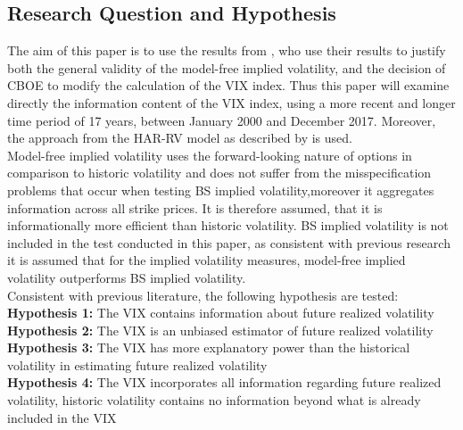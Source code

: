 \subsection{Research Question and Hypothesis}\label{sec:32Hypothesis}
The aim of this paper is to use the results from \textcite{jiang2003}, who use their results to justify both the general validity of the model-free implied volatility, and the decision of \gls{CBOE} to modify the calculation of the VIX index. Thus this paper will examine directly the information content of the VIX index, using a more recent and longer time period of 17 years, between January 2000 and December 2017. 
Moreover, the approach from the HAR-RV model as described by \textcite{Corsi2009} is used.\\
Model-free implied volatility uses the forward-looking nature of options in comparison to historic volatility and does not suffer from the misspecification problems that occur when testing \gls{BS} implied volatility,moreover it aggregates information across all strike prices. It is therefore assumed, that it is informationally more efficient than historic volatility. \gls{BS} implied volatility is not included in the test conducted in this paper, as consistent with previous research it is assumed that for the implied volatility measures, model-free implied volatility outperforms \gls{BS} implied volatility. \\
Consistent with previous literature, the following hypothesis are tested:\\
\textbf{Hypothesis 1:} The VIX contains information about future realized volatility\\
\textbf{Hypothesis 2:} The VIX is an unbiased estimator of future realized volatility\\
\textbf{Hypothesis 3:} The VIX has more explanatory power than the historical volatility in estimating future realized volatility\\
\textbf{Hypothesis 4:} The VIX incorporates all information regarding future realized volatility, historic volatility contains no information beyond what is already included in the VIX



